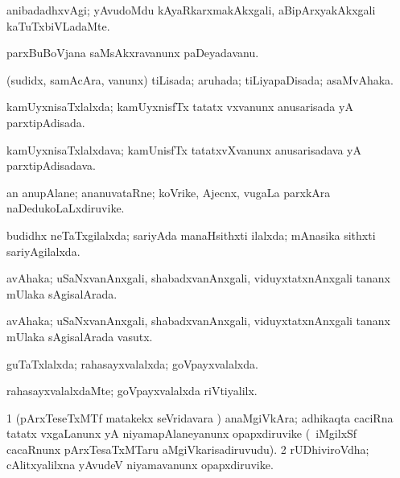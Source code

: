 \bentry
{}
\gl{\kirxvi}
\bmng
anibadadhxvAgi; yAvudoMdu kAyaRkarxmakAkxgali, aBipArxyakAkxgali kaTuTxbiVLadaMte. 
\emng
\eentry

\bentry
{}
\gl{\nA}
\bmng
parxBuBoVjana saMsAkxravanunx paDeyadavanu. 
\emng
\eentry

\bentry
{}
\gl{\gu}
\bmng
(sudidx, samAcAra, \mo vanunx) tiLisada; aruhada; tiLiyapaDisada; asaMvAhaka. 
\emng
\eentry

\bentry
{}
\gl{\gu}
\bmng
kamUyxnisaTxlalxda; kamUyxnisfTx tatatx vxvanunx anusarisada yA parxtipAdisada. 
\emng
\eentry

\bentry
{}
\gl{\nA}
\bmng
kamUyxnisaTxlalxdava; kamUnisfTx tatatxvXvanunx anusarisadava yA parxtipAdisadava. 
\emng
\eentry

\bentry
{}
\gl{\nA}
\bmng
an anupAlane; ananuvataRne; koVrike, Ajecnx, \mo vugaLa parxkAra naDedukoLaLxdiruvike. 
\emng
\eentry

\bentry
{}
\gl{\gu}
\expl{\Latin}
\bmng
budidhx neTaTxgilalxda; sariyAda manaHsithxti ilalxda; mAnasika sithxti sariyAgilalxda. 
\emng
\eentry

\bentry
{}
\gl{\gu}
\bmng
avAhaka; uSaNxvanAnxgali, shabadxvanAnxgali, viduyxtatxnAnxgali tananx mUlaka sAgisalArada. 
\emng
\eentry

\bentry
{}
\gl{\nA}
\bmng
avAhaka; uSaNxvanAnxgali, shabadxvanAnxgali, viduyxtatxnAnxgali tananx mUlaka sAgisalArada vasutx. 
\emng
\eentry

\bentry
{}
\gl{\gu}
\bmng
guTaTxlalxda; rahasayxvalalxda; goVpayxvalalxda. 
\emng
\eentry

\bentry
{}
\gl{\kirxvi}
\bmng
rahasayxvalalxdaMte; goVpayxvalalxda riVtiyalilx. 
\emng
\eentry

\bentry
{}
\gl{\nA}
\bmng
\bnum
\num{1} (pArxTeseTxMTf matakekx seVridavara \vi) anaMgiVkAra; adhikaqta caciRna tatatx vxgaLanunx yA niyamapAlaneyanunx opapxdiruvike (\kanmu\ iMgilxSf cacaRnunx pArxTesaTxMTaru aMgiVkarisadiruvudu). 
\num{2} rUDhiviroVdha; cAlitxyalilxna yAvudeV niyamavanunx opapxdiruvike. 
\enum
\emng
\eentry

